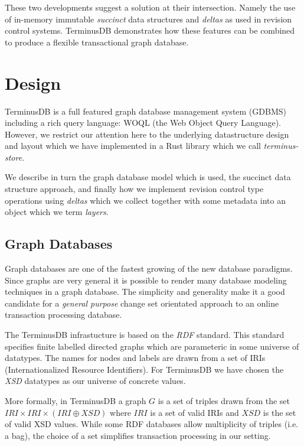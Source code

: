 \documentclass[10pt, a4paper, twocolumn]{article} %
\begin{document}
These two developments suggest a solution at their
intersection. Namely the use of in-memory immutable {\em succinct}
data structures and {\em deltas} as used in revision control
systems. TerminusDB demonstrates how these features can be combined to
produce a flexible transactional graph database. 

\section{Design}

TerminusDB is a full featured graph database management system (GDBMS)
including a rich query language: WOQL (the Web Object Query Language).
However, we restrict our attention here to the underlying
datastructure design and layout which we have implemented in a
Rust\cite{Blandy:2015:RPL:3019371} library which we call {\em{terminus-store}}.

We describe in turn the graph database model which is used, the
succinct data structure approach, and finally how we implement
revision control type operations using {\em deltas} which we collect
together with some metadata into an object which we term {\em layers}.

\subsection{Graph Databases}

Graph databases are one of the fastest growing of the new database
paradigms\cite{}. Since graphs are very general it is possible to
render many database modeling techniques in a graph database. The
simplicity and generality make it a good candidate for a {\em general
purpose} change set orientated approach to an online transaction
processing database.

The TerminusDB infrastucture is based on the {\em RDF} standard. This
standard specifies finite labelled directed graphs which are
parameteric in some universe of datatypes. The names for nodes and
labels are drawn from a set of IRIs (Internationalized Resource
Identifiers). For TerminusDB we have chosen the {\em XSD} datatypes as
our universe of concrete values.

More formally, in TerminusDB a graph \(G\) is a set of triples drawn
from the set \( IRI \times IRI \times (IRI \oplus XSD)\) where \(IRI\)
is a set of valid IRIs and \(XSD\) is the set of valid XSD values.
While some RDF databases allow multiplicity of triples (i.e. a bag),
the choice of a set simplifies transaction processing in our setting.
\end{document}
